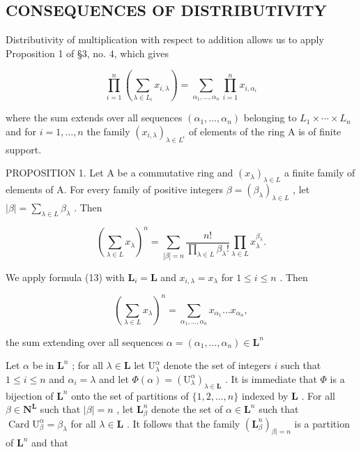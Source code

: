 \subsection{CONSEQUENCES OF DISTRIBUTIVITY}

Distributivity of multiplication with respect to addition allows us to apply Proposition 1 of §3, no. 4, which gives

\[
\prod_ {i = 1} ^ {n} \left(\sum_ {\lambda \in L _ {i}} x _ {i, \lambda}\right) = \sum_ {\alpha_ {1}, \dots , \alpha_ {n}} \prod_ {i = 1} ^ {n} x _ {i, \alpha_ {i}}\tag{13}
\]

where the sum extends over all sequences \((\alpha_{1},\ldots,\alpha_{n})\) belonging to \(L_{1}\times\cdots\times L_{n}\) and for \(i=1,\ldots,n\) the family \((x_{i,\lambda})_{\lambda\in L^{i}}\) of elements of the ring A is of finite support.

PROPOSITION 1. Let A be a commutative ring and \((x_{\lambda})_{\lambda \in L}\) a finite family of elements of A. For every family of positive integers \(\beta = (\beta_{\lambda})_{\lambda \in L}\) , let \(|\beta| = \sum_{\lambda \in L} \beta_{\lambda}\) . Then

\[
\left(\sum_ {\lambda \in L} x _ {\lambda}\right) ^ {n} = \sum_ {| \beta | = n} \frac {n !}{\prod_ {\lambda \in L} \beta_ {\lambda} !} \prod_ {\lambda \in L} x _ {\lambda} ^ {\beta_ {\lambda}}.\tag{14}
\]

We apply formula (13) with \(\mathbf{L}_i = \mathbf{L}\) and \(x_{i,\lambda} = x_{\lambda}\) for \(1 \leqslant i \leqslant n\) . Then

\[
\left(\sum_ {\lambda \in L} x _ {\lambda}\right) ^ {n} = \sum_ {\alpha_ {1}, \dots , \alpha_ {n}} x _ {\alpha_ {1}} \dots x _ {\alpha_ {n}},\tag{15}
\]

the sum extending over all sequences \(\alpha = (\alpha_{1},\ldots ,\alpha_{n})\in \mathbf{L}^{n}\)

Let \(\alpha\) be in \(\mathbf{L}^n\) ; for all \(\lambda \in \mathbf{L}\) let \(\mathrm{U}_{\lambda}^{\alpha}\) denote the set of integers \(i\) such that \(1 \leqslant i \leqslant n\) and \(\alpha_i = \lambda\) and let \(\Phi(\alpha) = (\mathrm{U}_{\lambda}^{\alpha})_{\lambda \in \mathbf{L}}\) . It is immediate that \(\Phi\) is a bijection of \(\mathbf{L}^n\) onto the set of partitions of \(\{1, 2, \ldots, n\}\) indexed by \(\mathbf{L}\) . For all \(\beta \in \mathbf{N}^{\mathbf{L}}\) such that \(|\beta| = n\) , let \(\mathbf{L}_{\beta}^n\) denote the set of \(\alpha \in \mathbf{L}^n\) such that \(\operatorname{Card} \mathrm{U}_{\beta}^{\alpha} = \beta_{\lambda}\) for all \(\lambda \in \mathbf{L}\) . It follows that the family \((\mathbf{L}_{\beta}^n)_{\beta | = n}\) is a partition of \(\mathbf{L}^n\) and that

